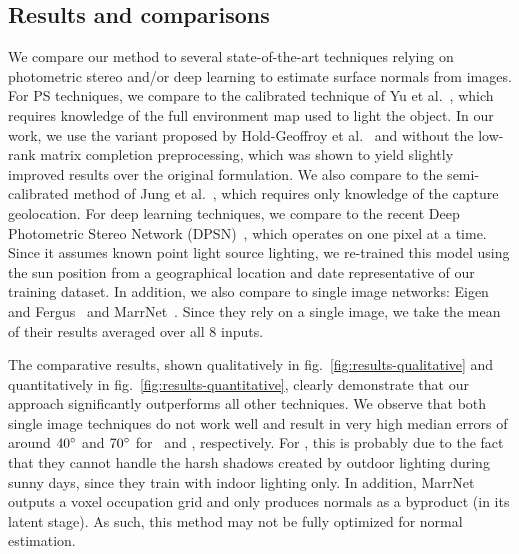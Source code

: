 

\subsection{Results and comparisons}

We compare our method to several state-of-the-art techniques relying on photometric stereo and/or deep learning to estimate surface normals from images. For PS techniques, we compare to the calibrated technique of Yu et al.~\cite{yu-iccp-13}, which requires knowledge of the full environment map used to light the object. In our work, we use the variant proposed by Hold-Geoffroy et al.~\cite{holdgeoffroy-3dv-15} and without the low-rank matrix completion preprocessing, which was shown to yield slightly improved results over the original formulation. We also compare to the semi-calibrated method of Jung et al.~\cite{jung-cvpr-15}, which requires only knowledge of the capture geolocation. For deep learning techniques, we compare to the recent Deep Photometric Stereo Network (DPSN)~\cite{santo-iccv-17}, which operates on one pixel at a time. Since it assumes known point light source lighting, we re-trained this model using the sun position from a geographical location and date representative of our training dataset. In addition, we also compare to single image networks: Eigen and Fergus~\cite{eigen-iccv-15} and MarrNet~\cite{wu-nips-17}. Since they rely on a single image, we take the mean of their results averaged over all 8 inputs. 

The comparative results, shown qualitatively in fig.~\ref{fig:results-qualitative} and quantitatively in fig.~\ref{fig:results-quantitative}, clearly demonstrate that our approach significantly outperforms all other techniques. We observe that both single image techniques do not work well and result in very high median errors of around $40^{\circ}$ and $70^{\circ}$ for~\cite{wu-nips-17} and \cite{eigen-iccv-15}, respectively. For \cite{eigen-iccv-15}, this is probably due to the fact that they cannot handle the harsh shadows created by outdoor lighting during sunny days, since they train with indoor lighting only. In addition, MarrNet~\cite{wu-nips-17} outputs a voxel occupation grid and only produces normals as a byproduct (in its latent stage). As such, this method may not be fully optimized for normal estimation.

